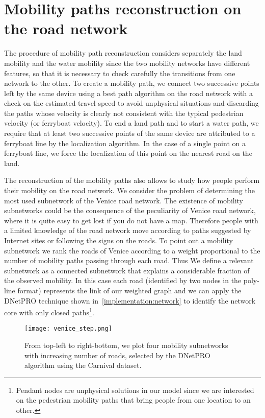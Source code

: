 \documentclass{standalone}
\begin{document}
\section*{Mobility paths reconstruction on the road network}

The procedure of mobility path reconstruction considers separately the land mobility and the water mobility since the two mobility networks have different features, so that it is necessary to check carefully the transitions from one network to the other.
To create a mobility path, we connect two successive points left by the same device using a best path algorithm on the road network with a check on the estimated travel speed to avoid unphysical situations and discarding the paths whose velocity is clearly not consistent with
the typical pedestrian velocity (or ferryboat velocity).
To end a land path and to start a water path, we require that at least two successive points of the same device are attributed to a ferryboat line by the localization algorithm.
In the case of a single point on a ferryboat line, we force the localization of this point on the nearest road on the land.

The reconstruction of the mobility paths also allows to study how people perform their mobility on the road network.
We consider the problem of determining the most used subnetwork of the Venice road network.
The existence of mobility subnetworks could be the consequence of the peculiarity of Venice road network, where it is quite easy to get lost
if you do not have a map.
Therefore people with a limited knowledge of the road network move according to paths suggested by Internet sites or following the signs on the roads.
To point out a mobility subnetwork we rank the roads of Venice according to a weight proportional to the number of mobility paths passing through each road.
Thus We define a relevant subnetwork as a connected subnetwork that explains a considerable fraction of the observed mobility.
In this case each road (identified by two nodes in the poly-line format) represents the link of our weighted graph and we can apply the DNetPRO technique shown in~\ref{implementation:network} to identify the network core with only closed paths\footnote{
  Pendant nodes are unphysical solutions in our model since we are interested on the pedestrian mobility paths that bring people from one location to an other.
}.

\begin{center}
\begin{figure}[htbp]
\centering
\texttt{[image: venice\_step.png]}
\caption{From top-left to right-bottom, we plot four mobility subnetworks with increasing number of roads, selected by the DNetPRO algorithm using the Carnival dataset.
}
\label{fig:venice_step}
\end{figure}
\end{center}
\end{document}
